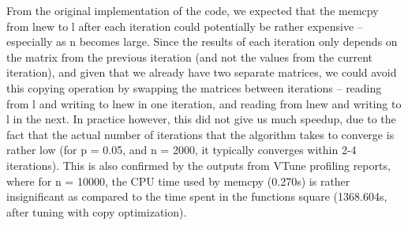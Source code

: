 From the original implementation of the code, we expected that the memcpy
from lnew to l after each iteration could potentially be rather expensive
-- especially as n becomes large. Since the results of each iteration
only depends on the matrix from the previous iteration (and not the
values from the current iteration), and given that we already have two
separate matrices, we could avoid this copying operation by swapping the
matrices between iterations -- reading from l and writing to lnew in one
iteration, and reading from lnew and writing to l in the next. In
practice however, this did not give us much speedup, due to the fact that
the actual number of iterations that the algorithm takes to converge is
rather low (for p = 0.05, and n = 2000, it typically converges within 2-4
iterations). This is also confirmed by the outputs from VTune profiling
reports, where for n = 10000, the CPU time used by memcpy (0.270s) is
rather insignificant as compared to the time spent in the functions
square (1368.604s, after tuning with copy optimization).

